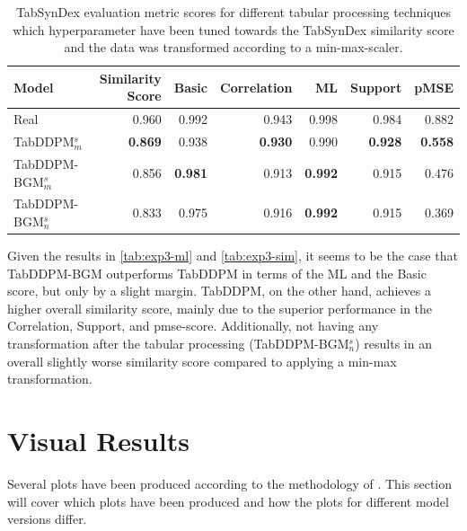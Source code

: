 \begin{table}[h]
	\centering
	\begin{tabular}{lrrrrrr}
		\toprule
		\textbf{Model}        & \textbf{Similarity Score} & \textbf{Basic} & \textbf{Correlation} & \textbf{ML}    & \textbf{Support} & \textbf{pMSE}  \\
		\midrule
		Real                  & 0.960                     & 0.992          & 0.943                & 0.998          & 0.984            & 0.882          \\
		TabDDPM$^{s}_{m}$     & \textbf{0.869}            & 0.938          & \textbf{0.930}       & 0.990          & \textbf{0.928}   & \textbf{0.558} \\
		TabDDPM-BGM$^{s}_{m}$ & 0.856                     & \textbf{0.981} & 0.913                & \textbf{0.992} & 0.915            & 0.476          \\
		TabDDPM-BGM$^{s}_{n}$ & 0.833                     & 0.975          & 0.916                & \textbf{0.992} & 0.915            & 0.369          \\
		\bottomrule
	\end{tabular}
	\caption[Experiment 3 TabSynDex]{TabSynDex evaluation metric scores for different tabular processing techniques which hyperparameter have been tuned towards the TabSynDex similarity score
		and the data was transformed according to a min-max-scaler.}
	\label{tab:exp3-sim}
\end{table}

Given the results in \autoref{tab:exp3-ml} and \autoref{tab:exp3-sim}, it seems to be the case that TabDDPM-BGM outperforms TabDDPM in terms of the ML and the Basic score, but only by a slight margin.
TabDDPM, on the other hand, achieves a higher overall similarity score, mainly due to the superior performance in the Correlation, Support, and \gls{pmse}-score.
Additionally, not having any transformation after the tabular processing (TabDDPM-BGM$^{s}_{n}$) results in an overall slightly worse similarity score compared to applying a min-max transformation.


\section{Visual Results}
\label{ch:results-Visual}

Several plots have been produced according to the methodology of \cite{brenninkmeijer2019GenerationEvaluationTabular}.
This section will cover which plots have been produced and how the plots for different model versions differ.


